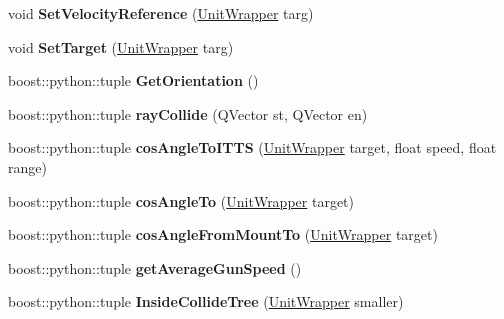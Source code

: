 \begin{DoxyCompactItemize}
\item 
void {\bfseries Set\+Velocity\+Reference} (\hyperlink{classUnitWrapper}{Unit\+Wrapper} targ)\hypertarget{classUnitWrapper_a433488ab8c40d716c2ded54d874b4147}{}\label{classUnitWrapper_a433488ab8c40d716c2ded54d874b4147}

\item 
void {\bfseries Set\+Target} (\hyperlink{classUnitWrapper}{Unit\+Wrapper} targ)\hypertarget{classUnitWrapper_a01e6c34ea95414279af67fe114b0ec3e}{}\label{classUnitWrapper_a01e6c34ea95414279af67fe114b0ec3e}

\item 
boost\+::python\+::tuple {\bfseries Get\+Orientation} ()\hypertarget{classUnitWrapper_a7d429bf9f0e857f1be6e7805df08a3ae}{}\label{classUnitWrapper_a7d429bf9f0e857f1be6e7805df08a3ae}

\item 
boost\+::python\+::tuple {\bfseries ray\+Collide} (Q\+Vector st, Q\+Vector en)\hypertarget{classUnitWrapper_a850869cb519205d25167835fe366c58c}{}\label{classUnitWrapper_a850869cb519205d25167835fe366c58c}

\item 
boost\+::python\+::tuple {\bfseries cos\+Angle\+To\+I\+T\+TS} (\hyperlink{classUnitWrapper}{Unit\+Wrapper} target, float speed, float range)\hypertarget{classUnitWrapper_a078a030580f7dcdf14fa1dbad6115ab6}{}\label{classUnitWrapper_a078a030580f7dcdf14fa1dbad6115ab6}

\item 
boost\+::python\+::tuple {\bfseries cos\+Angle\+To} (\hyperlink{classUnitWrapper}{Unit\+Wrapper} target)\hypertarget{classUnitWrapper_a3cc630d6e36b4c1e98e38c333ab2e6af}{}\label{classUnitWrapper_a3cc630d6e36b4c1e98e38c333ab2e6af}

\item 
boost\+::python\+::tuple {\bfseries cos\+Angle\+From\+Mount\+To} (\hyperlink{classUnitWrapper}{Unit\+Wrapper} target)\hypertarget{classUnitWrapper_aba89e772e568dc0ffa2e8dc0ae1b77ea}{}\label{classUnitWrapper_aba89e772e568dc0ffa2e8dc0ae1b77ea}

\item 
boost\+::python\+::tuple {\bfseries get\+Average\+Gun\+Speed} ()\hypertarget{classUnitWrapper_a81e70927129d7dd97826b96411082a05}{}\label{classUnitWrapper_a81e70927129d7dd97826b96411082a05}

\item 
boost\+::python\+::tuple {\bfseries Inside\+Collide\+Tree} (\hyperlink{classUnitWrapper}{Unit\+Wrapper} smaller)\hypertarget{classUnitWrapper_aff6cba358e090113510241885a9eca78}{}\label{classUnitWrapper_aff6cba358e090113510241885a9eca78}


\end{DoxyCompactItemize}
